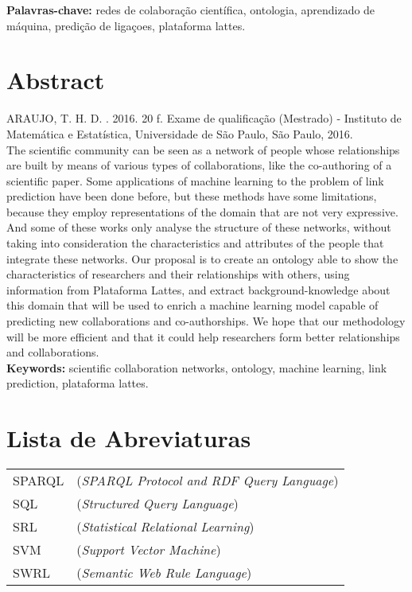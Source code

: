 \documentclass[11pt,twoside,a4paper]{book}
\begin{document}
\noindent \textbf{Palavras-chave:} redes de colaboração científica, ontologia, aprendizado de máquina, predição de ligaçoes, plataforma lattes.

\chapter*{Abstract}
\noindent ARAUJO, T. H. D. \textbf{\mydocumenttitle}.
2016. 20 f.
Exame de qualificação (Mestrado) - Instituto de Matemática e Estatística,
Universidade de São Paulo, São Paulo, 2016.
\\

The scientific community can be seen as a network of people whose relationships are built by means of various types of collaborations, like the co-authoring of a scientific paper. Some applications of machine learning to the problem of link prediction have been done before, but these methods have some limitations, because they employ representations of the domain that are not very expressive. And some of these works only analyse the structure of these networks, without taking into consideration the characteristics and attributes of the people that integrate these networks. Our proposal is to create an ontology able to show the characteristics of researchers and their relationships with others, using information from Plataforma Lattes, and extract background-knowledge about this domain that will be used to enrich a machine learning model capable of predicting new collaborations and co-authorships. We hope that our methodology will be more efficient and that it could help researchers form better relationships and collaborations.
\\

\noindent \textbf{Keywords:} scientific collaboration networks, ontology, machine learning, link prediction, plataforma lattes.

\tableofcontents    %

\chapter{Lista de Abreviaturas}
\begin{tabular}{ll}
        SPARQL      & (\textit{SPARQL Protocol and RDF Query Language})\\
        SQL         & (\textit{Structured Query Language})\\
        SRL         & (\textit{Statistical Relational Learning})\\
        SVM         & (\textit{Support Vector Machine})\\
        SWRL        & (\textit{Semantic Web Rule Language})\\
\end{tabular}
\end{document}
